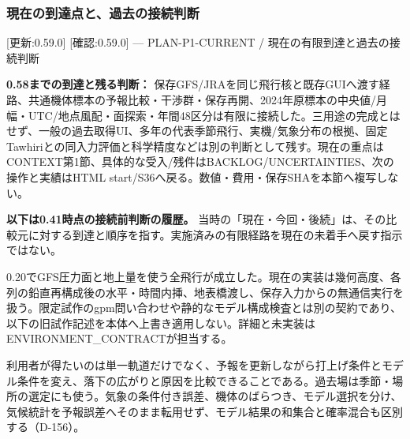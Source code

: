 \documentclass[11pt,a4paper]{article}
\begin{document}
\subsubsection{現在の到達点と、過去の接続判断}\label{ux73feux5728ux306eux5230ux9054ux70b9ux3068ux904eux53bbux306eux63a5ux7d9aux5224ux65ad}

{[}更新:0.59.0{]} {[}確認:0.59.0{]} --- PLAN-P1-CURRENT /
現在の有限到達と過去の接続判断

\textbf{0.58までの到達と残る判断：}
保存GFS/JRAを同じ飛行核と既存GUIへ渡す経路、共通機体標本の予報比較・干渉群・保存再開、2024年原標本の中央値/月幅・UTC/地点風配・面探索・年間48区分は有限に接続した。三用途の完成とはせず、一般の過去取得UI、多年の代表季節飛行、実機/気象分布の根拠、固定Tawhiriとの同入力評価と科学精度などは別の判断として残す。現在の重点はCONTEXT第1節、具体的な受入/残件はBACKLOG/UNCERTAINTIES、次の操作と実績はHTML
start/S36へ戻る。数値・費用・保存SHAを本節へ複写しない。

\textbf{以下は0.41時点の接続前判断の履歴。}
当時の「現在・今回・後続」は、その比較元に対する到達と順序を指す。実施済みの有限経路を現在の未着手へ戻す指示ではない。

0.20でGFS圧力面と地上量を使う全飛行が成立した。現在の実装は幾何高度、各列の鉛直再構成後の水平・時間内挿、地表橋渡し、保存入力からの無通信実行を扱う。限定試作のgpm問い合わせや静的なモデル構成検査とは別の契約であり、以下の旧試作記述を本体へ上書き適用しない。詳細と未実装はENVIRONMENT\_CONTRACTが担当する。

利用者が得たいのは単一軌道だけでなく、予報を更新しながら打上げ条件とモデル条件を変え、落下の広がりと原因を比較できることである。過去場は季節・場所の選定にも使う。気象の条件付き誤差、機体のばらつき、モデル選択を分け、気候統計を予報誤差へそのまま転用せず、モデル結果の和集合と確率混合も区別する（D-156）。
\end{document}
